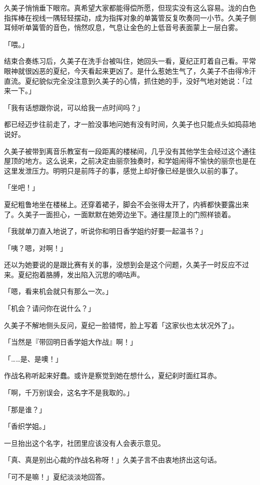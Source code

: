 \documentclass[UTF8]{ctexart}
\begin{document}
    久美子悄悄垂下眼帘。真希望大家都能得偿所愿，但现实没有这么容易。泷的白色指挥棒在视线一隅轻轻摆动，成为指挥对象的单簧管反复吹奏同一小节。久美子侧耳倾听单簧管的音色，悄然叹息，气息让金色的上低音号表面蒙上一层白雾。 

    「喂。」 

    结束合奏练习后，久美子在洗手台被叫住，她回头一看，夏纪正盯着自己看。平常眼神就很凶恶的夏纪，今天看起来更凶了。是什么惹她生气了，久美子不由得冷汗直流。夏纪貌似完全没注意到久美子的心情，抓住她的手，没好气地对她说：「过来一下。」 

    「我有话想跟你说，可以给我一点时间吗？」 

    都已经迈步往前走了，才一脸没事地问她有没有时间，久美子也只能点头如捣蒜地说好。 

    久美子被带到离音乐教室有一段距离的楼梯间，几乎没有其他学生会经过这个通往屋顶的地方。这么说来，之前决定由丽奈独奏时，和学姐闹得不愉快的丽奈也是在这里发泄压力。明明只是前阵子的事，感觉上却好像已经是很久以前的事了。 

    「坐吧！」 

    夏纪粗鲁地坐在楼梯上。还穿着裙子，脚会不会张得太开了，内裤都快要露出来了。久美子一面担心，一面默默在她旁边坐下。通往屋顶上的门照样锁着。 

    「我就单刀直入地说了，听说你和明日香学姐约好要一起温书？」 

    「咦？嗯，对啊！」 

    还以为她要说的是跟比赛有关的事，没想到会是这个问题，久美子一时反应不过来。夏纪抱着胳膊，发出陷入沉思的嘀咕声。 

    「嗯，看来机会就只有那么一次。」 

    「机会？请问你在说什么？」 

    久美子不解地侧头反问，夏纪一脸错愕，脸上写着「这家伙也太状况外了」。 

    「当然是『带回明日香学姐大作战』啊！」 

    「……是、是噢！」 

    作战名称听起来好蠢。或许是察觉到她在想什么，夏纪刹时面红耳赤。 

    「啊，千万别误会，这名字不是我取的。」 

    「那是谁？」 

    「香织学姐。」 

    一旦抬出这个名字，社团里应该没有人会表示意见。 

    「真、真是别出心裁的作战名称呀！」久美子言不由衷地挤出这句话。 

    「可不是嘛！」夏纪淡淡地回答。 
\end{document}
